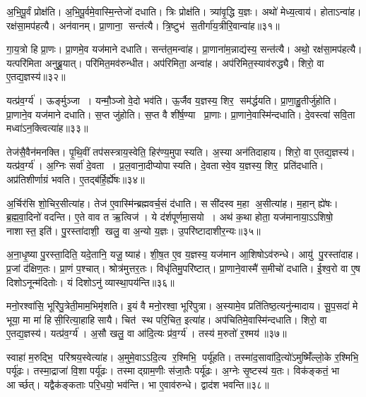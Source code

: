 अ॒भि॒पू॒र्वं प्रोक्ष॑ति। अ॒भि॒पू॒र्वमे॒वास्मि॒न्तेजो॑ दधाति। त्रिः प्रोक्ष॑ति। त्र्या॑वृ॒द्धि य॒ज्ञः। अथो॑ मेध्य॒त्वाय॑। होताऽन्वा॑ह। रक्ष॑सा॒मप॑हत्यै। अन॑वानम्। प्रा॒णाना॒ सन्त॑त्यै। त्रि॒ष्टुभ॑ स॒तीर्गा॑य॒त्रीरि॒वान्वा॑ह॥३१॥

गा॒य॒त्रो हि प्रा॒णः। प्रा॒णमे॒व यज॑माने दधाति। सन्त॑त॒मन्वा॑ह। प्रा॒णाना॑म॒न्नाद्य॑स्य॒ सन्त॑त्यै। अथो॒ रक्ष॑सा॒मप॑हत्यै। यत्परि॑मिता अनुब्रू॒यात्। परि॑मित॒मव॑रुन्धीत। अप॑रिमिता॒ अन्वा॑ह। अप॑रिमित॒स्याव॑रुद्ध्यै। शिरो॒ वा ए॒तद्य॒ज्ञस्य॑॥३२॥

यत्प्र॑व॒र्ग्य॑। ऊर्ङ्मुञ्जा। यन्मौ॒ञ्जो वे॒दो भव॑ति। ऊ॒र्जैव य॒ज्ञस्य॒ शिर॒ सम॑र्द्धयति। प्रा॒णा॒हु॒तीर्जु॑होति। प्रा॒णाने॒व यज॑माने दधाति। स॒प्त जु॑होति। स॒प्त वै शी॑र्\mbox{}ष॒ण्या प्रा॒णाः। प्रा॒णाने॒वास्मि॑न्दधाति। दे॒वस्त्वा॑ सवि॒ता मध्वा॑ऽन॒क्त्वित्या॑ह॥३३॥

तेज॑सै॒वैन॑मनक्ति। पृ॒थि॒वीं तप॑सस्त्राय॒स्वेति॒ हिर॑ण्य॒मुपास्यति। अ॒स्या अन॑तिदाहाय। शिरो॒ वा ए॒तद्य॒ज्ञस्य॑। यत्प्र॑व॒र्ग्य॑। अ॒ग्निः सर्वा॑ दे॒वता। प्र॒ल॒वाना॒दीप्योपास्यति। दे॒वतास्वे॒व य॒ज्ञस्य॒ शिर॒ प्रति॑दधाति। अप्र॑तिशीर्णाग्रं भवति। ए॒तद्ब॑र्\mbox{}हि॒र्\mbox{}ह्ये॑षः॥३४॥

अ॒र्चिर॑सि शो॒चिर॒सीत्या॑ह। तेज॑ ए॒वास्मि॑न्ब्रह्मवर्च॒सं द॑धाति। ससी॑दस्व म॒हा अ॒सीत्या॑ह। म॒हान् ह्ये॑षः। ब्र॒ह्म॒वा॒दिनो॑ वदन्ति। ए॒ते वाव त ऋ॒त्विज॑। ये द॑र्\mbox{}शपूर्णमा॒सयो। अथ॑ क॒था होता॒ यज॑मानाया॒ऽऽशिषो॒ नाशास्त॒ इति॑। पु॒रस्ता॑दाशी॒ खलु॒ वा अ॒न्यो य॒ज्ञः। उ॒परि॑ष्टादाशीर॒न्यः॥३५॥

अ॒ना॒धृ॒ष्या पु॒रस्ता॒दिति॒ यदे॒तानि॒ यजू॒ष्याह॑। शी॒\ar{}\mbox{}ष॒त ए॒व य॒ज्ञस्य॒ यज॑मान आ॒शिषोऽव॑रुन्धे। आयु॑ पु॒रस्ता॑दाह। प्र॒जां द॑क्षिण॒तः। प्रा॒णं प॒श्चात्। श्रोत्र॑मुत्तर॒तः। विधृ॑तिमु॒परि॑ष्टात्। प्रा॒णाने॒वास्मै॑ स॒मीचो॑ दधाति। ई॒श्व॒रो वा ए॒ष दिशोऽनून्म॑दितोः। यं दिशोऽनु॑ व्यास्था॒पय॑न्ति॥३६॥

मनो॒रश्वा॑सि॒ भूरि॑पु॒त्रेती॒माम॒भिमृ॑शति। इ॒यं वै मनो॒रश्वा॒ भूरि॑पुत्रा। अ॒स्यामे॒व प्रति॑तिष्ठ॒त्यनु॑न्मादाय। सू॒प॒सदा॑ मे भूया॒ मा मा॑ हिसी॒रित्या॒हाहिसायै। चित॑ स्थ परि॒चित॒ इत्या॑ह। अप॑चितिमे॒वास्मि॑न्दधाति। शिरो॒ वा ए॒तद्य॒ज्ञस्य॑। यत्प्र॑व॒र्ग्य॑। अ॒सौ खलु॒ वा आ॑दि॒त्यः प्र॑व॒र्ग्य॑। तस्य॑ म॒रुतो॑ र॒श्मय॑॥३७॥

स्वाहा॑ म॒रुद्भि॒ परि॑श्रय॒स्वेत्या॑ह। अ॒मुमे॒वाऽऽदि॒त्य र॒श्मिभि॒ पर्यू॑हति। तस्मा॑द॒सावा॑दि॒त्यो॑ऽमुष्मिँ॑ल्लो॒के र॒श्मिभि॒ पर्यू॑ढः। तस्मा॒द्राजा॑ वि॒शा पर्यू॑ढः। तस्माद्ग्राम॒णीः स॑जा॒तैः पर्यू॑ढः। अ॒ग्नेः सृ॒ष्टस्य॑ य॒तः। विक॑ङ्कतं॒ भा आर्च्छत्। यद्वैक॑ङ्कताः परि॒धयो॒ भव॑न्ति। भा ए॒वाव॑रुन्धे। द्वाद॑श भवन्ति॥३८॥

